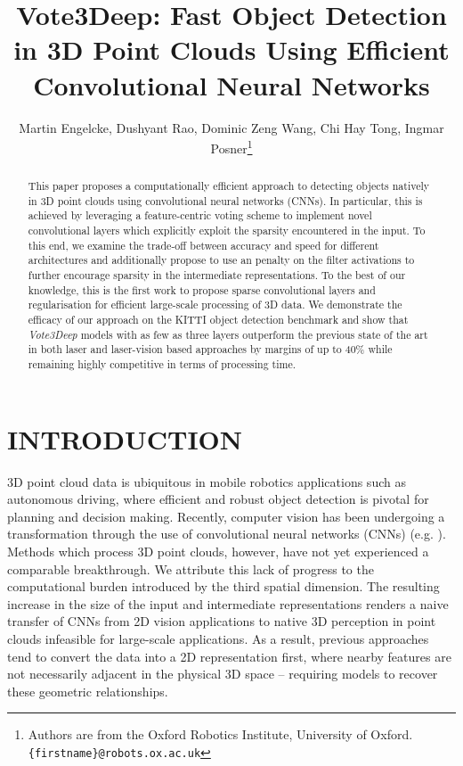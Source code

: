 \documentclass[letterpaper, 10 pt, conference]{tex_style/ieeeconf}
\title{\LARGE \bf
Vote3Deep: Fast Object Detection in 3D Point Clouds Using Efficient Convolutional Neural Networks
}
\author{Martin Engelcke, Dushyant Rao, Dominic Zeng Wang, Chi Hay Tong, Ingmar Posner\thanks{Authors are from the Oxford Robotics Institute, University of Oxford.
\texttt{\{firstname\}@robots.ox.ac.uk}}}
\begin{document}
\maketitle
\thispagestyle{empty}
\pagestyle{empty}


\begin{abstract}

This paper proposes a computationally efficient approach to detecting objects natively in 3D point clouds using convolutional neural networks (CNNs).
In particular, this is achieved by leveraging a feature-centric voting scheme to implement novel convolutional layers which explicitly exploit the sparsity encountered in the input.
To this end, we examine the trade-off between accuracy and speed for different architectures and additionally propose to use an  penalty on the filter activations to further encourage sparsity in the intermediate representations.
To the best of our knowledge, this is the first work to propose sparse convolutional layers and  regularisation for efficient large-scale processing of 3D data.
We demonstrate the efficacy of our approach on the KITTI object detection benchmark and show that \emph{Vote3Deep} models with as few as three layers outperform the previous state of the art in both laser and laser-vision based approaches by margins of up to 40\% while remaining highly competitive in terms of processing time. 
\end{abstract}



\section{INTRODUCTION}
3D point cloud data is ubiquitous in mobile robotics applications such as autonomous driving, where efficient and robust object detection is pivotal for planning and decision making. Recently, computer vision has been undergoing a transformation through the use of convolutional neural networks (CNNs) (e.g. \cite{krizhevsky2012imagenet, simonyan2014very, szegedy2015going, he2015deep}).
Methods which process 3D point clouds, however, have not yet experienced a comparable breakthrough.
We attribute this lack of progress to the computational burden introduced by the third spatial dimension.
The resulting increase in the size of the input and intermediate representations renders a naive transfer of CNNs from 2D vision applications to native 3D perception in point clouds infeasible for large-scale applications.
As a result, previous approaches tend to convert the data into a 2D representation first, where nearby features are not necessarily adjacent in the physical 3D space -- requiring models to recover these geometric relationships.
\end{document}

